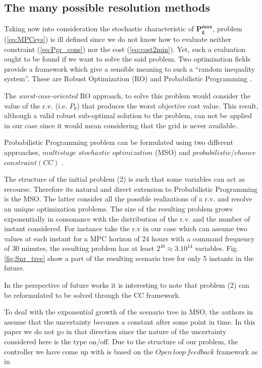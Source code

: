 \documentclass[conference]{IEEEtran}
\begin{document}
\subsection{The many possible resolution methods}
Taking now into consideration the stochastic characteristic of $\textbf{P}_\textbf{g}^{\textbf{max}}$, problem (\ref{eq:MPCsys}) is ill defined since we do not know how to evaluate  neither constraint (\ref{eq:Pgr_cons}) nor the cost (\ref{eq:cost2min}). Yet, such a evaluation ought to be found if we want to solve the said problem. Two optimization fields  provide a framework which give a sensible meaning to such a ``random inequality system”. These are Robust Optimization (RO) \cite{BenTal2009} and Probabilistic Programming \cite{Ankopa1995}.

The \textit{worst-case-oriented} RO approach, to solve this problem would consider the value of the r.v. (i.e. $P_0$) that produces the worst objective cost value. This result, although a valid robust sub-optimal solution to the problem, can not be applied in our case since it would mean considering that the grid is never available.
 
 Probabilistic Programming problem can be formulated using two different approaches, $multistage\, \, stochastic $ $optimization$ (MSO) \cite{Ankopa1995} and  $probabilistic/chance$  $constraint (CC)$ \cite{AChWCo1958,AChWCo1959,AnPre1970,Tsentai1988}. 
 
 The structure of the initial problem (2) is such that some variables can act as recourse. Therefore its natural and direct extension to Probabilistic Programming is the MSO. The latter consider all the possible realizations of a r.v. and resolve an unique optimization problems. The size of the resulting problem grows exponentially in consonance with the distribution of the r.v. and the number of instant considered. For instance take the r.v in our case which can assume two values at each instant for a MPC horizon of 24 hours  with a command frequency of 30 minutes, the resulting problem has at least $2^{48} \approx 3.10^{14}$ variables. Fig. \ref{fig:Snr_tree} show  a part of the resulting scenario tree for only  5 instants in the future. 

In the perspective of future works it is interesting to note that problem (2) can be reformulated to be solved through the CC framework.
  
To deal with the exponential growth of the scenario tree in MSO, the authors in \cite{SLuAJo2014} assume that the uncertainty becomes a constant after some point in time.  In this paper we do not go in that direction since the nature of the uncertainty considered here is the type on/off. Due to the structure of our problem, the controller we have come up with is based on the $Open\, loop\, feedback$ framework as in \cite{YBarRSi1969} 
 
\end{document}
